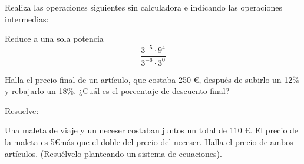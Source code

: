 \documentclass[addpoints,spanish, 12pt,a4paper]{exam}
\begin{document}
\begin{questions}

\question[3] Realiza las operaciones siguientes sin calculadora e indicando las operaciones intermedias:
\noaddpoints %
\addpoints


\question[1] Reduce a una sola potencia  \[\frac{3^{-5}\cdot9^{4}}{3^{-6}\cdot3^{0}}\]
\addpoints

\question[1] Halla el precio final de un artículo, que costaba 250 \euro, después de subirlo un 12\% y rebajarlo un 18\%. ¿Cuál es el porcentaje de descuento final?
\addpoints

\question[3] Resuelve:
\noaddpoints %
\begin{parts}
\part[1] \[3x+2-5x=9x+6x-5\]
\part[1] \[3\left(x-1\right)+2\left(x+6\right)=19\]
\part[1] \[\begin{cases}x+2y=5\\ 2x-y=0 \end{cases}\]
\end{parts}
\addpoints


\question[2] Una maleta de viaje y un neceser costaban juntos un total de 110 \euro . El precio de la maleta es 5\euro \space más que el doble del precio del neceser. Halla el precio de ambos artículos. (Resuélvelo planteando un sistema de ecuaciones).
\addpoints


\end{questions}
\end{document}
